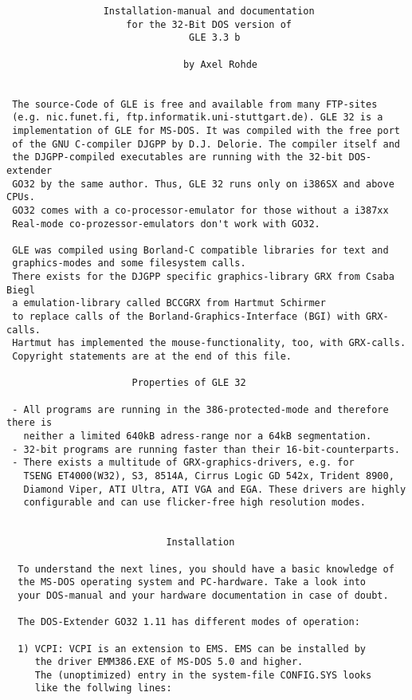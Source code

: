 \begin{center}
\begin{minipage}[t]{11.0cm}
{\scriptsize
\begin{verbatim}
                 Installation-manual and documentation 
                     for the 32-Bit DOS version of
                                GLE 3.3 b 

                               by Axel Rohde


 The source-Code of GLE is free and available from many FTP-sites
 (e.g. nic.funet.fi, ftp.informatik.uni-stuttgart.de). GLE 32 is a
 implementation of GLE for MS-DOS. It was compiled with the free port
 of the GNU C-compiler DJGPP by D.J. Delorie. The compiler itself and
 the DJGPP-compiled executables are running with the 32-bit DOS-extender
 GO32 by the same author. Thus, GLE 32 runs only on i386SX and above CPUs.
 GO32 comes with a co-processor-emulator for those without a i387xx
 Real-mode co-prozessor-emulators don't work with GO32. 

 GLE was compiled using Borland-C compatible libraries for text and
 graphics-modes and some filesystem calls.
 There exists for the DJGPP specific graphics-library GRX from Csaba Biegl
 a emulation-library called BCCGRX from Hartmut Schirmer
 to replace calls of the Borland-Graphics-Interface (BGI) with GRX-calls.
 Hartmut has implemented the mouse-functionality, too, with GRX-calls.
 Copyright statements are at the end of this file.

                      Properties of GLE 32

 - All programs are running in the 386-protected-mode and therefore there is
   neither a limited 640kB adress-range nor a 64kB segmentation.
 - 32-bit programs are running faster than their 16-bit-counterparts.
 - There exists a multitude of GRX-graphics-drivers, e.g. for
   TSENG ET4000(W32), S3, 8514A, Cirrus Logic GD 542x, Trident 8900,
   Diamond Viper, ATI Ultra, ATI VGA and EGA. These drivers are highly
   configurable and can use flicker-free high resolution modes.

   
                            Installation

  To understand the next lines, you should have a basic knowledge of
  the MS-DOS operating system and PC-hardware. Take a look into
  your DOS-manual and your hardware documentation in case of doubt.
  
  The DOS-Extender GO32 1.11 has different modes of operation:

  1) VCPI: VCPI is an extension to EMS. EMS can be installed by
     the driver EMM386.EXE of MS-DOS 5.0 and higher.
     The (unoptimized) entry in the system-file CONFIG.SYS looks
     like the follwing lines:
     

\end{verbatim}}
\end{minipage}
\end{center}
